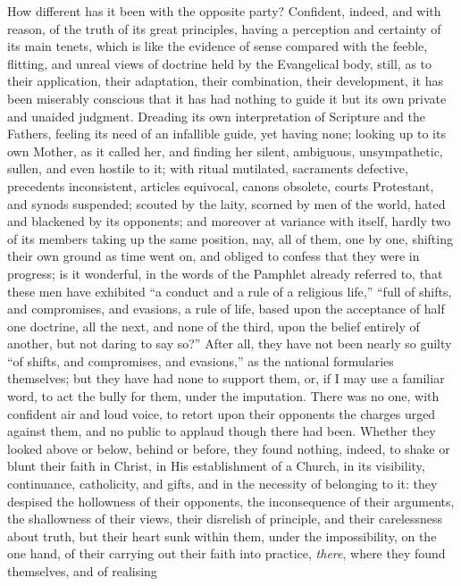 How different has it been with the opposite party? Confident,
indeed, and with reason, of the truth of its great principles, having
a perception and certainty of its main tenets, which is like the
evidence of sense compared with the feeble, flitting, and unreal views
of doctrine held by the Evangelical body, still, as to their
application, their adaptation, their combination, their development,
it has been miserably conscious that it has had nothing to guide it
but its own private and unaided judgment. Dreading its own
interpretation of Scripture and the Fathers, feeling its need of an
infallible guide, yet having none; looking up to its own Mother, as it
called her, and finding her silent, ambiguous, unsympathetic, sullen,
and even hostile to it; with ritual mutilated, sacraments defective,
precedents inconsistent, articles equivocal, canons obsolete, courts
Protestant, and synods suspended; scouted by the laity, scorned by men
of the world, hated and blackened by its opponents; and moreover at
variance with itself, hardly two of its members taking up the same
position, nay, all of them, one by one, shifting their own ground as
time went on, and obliged to confess that they were in progress; is it
wonderful, in the words of the Pamphlet already referred to, that
these men have exhibited ``a conduct and a rule of a religious
life,'' ``full of shifts, and compromises, and evasions, a
rule of life, based upon the acceptance of half one doctrine, all the
next, and none of the third, upon the belief entirely of another, but
not daring to say so?'' After all, they have not been nearly so
guilty ``of shifts, and compromises, and evasions,'' as the
national formularies themselves; but they have had none to support
them, or, if I may use a familiar word, to act the bully for them,
under the imputation. There was no one, with confident air and loud
voice, to retort upon their opponents the charges urged against them,
and no public to applaud though there had been. Whether they looked
above or below, behind or before, they found nothing, indeed, to shake
or blunt their faith in Christ, in His establishment of a Church, in
its visibility, continuance, catholicity, and gifts, and in the
necessity of belonging to it: they despised the hollowness of their
opponents, the inconsequence of their arguments, the shallowness of
their views, their disrelish of principle, and their carelessness
about truth, but their heart sunk within them, under the
impossibility, on the one hand, of their carrying out their faith into
practice, \emph{there}, where they found themselves, and of realising
